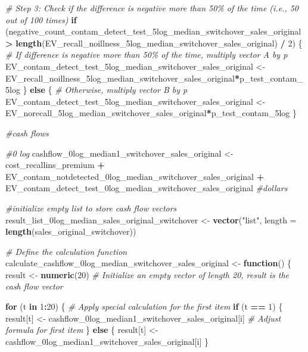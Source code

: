 \documentclass[
]{article}
\newenvironment{Shaded}{\begin{snugshade}}{\end{snugshade}}
\newcommand{\AttributeTok}[1]{\textcolor[rgb]{0.13,0.29,0.53}{#1}}
\newcommand{\CommentTok}[1]{\textcolor[rgb]{0.56,0.35,0.01}{\textit{#1}}}
\newcommand{\ControlFlowTok}[1]{\textcolor[rgb]{0.13,0.29,0.53}{\textbf{#1}}}
\newcommand{\DecValTok}[1]{\textcolor[rgb]{0.00,0.00,0.81}{#1}}
\newcommand{\FunctionTok}[1]{\textcolor[rgb]{0.13,0.29,0.53}{\textbf{#1}}}
\newcommand{\NormalTok}[1]{#1}
\newcommand{\OtherTok}[1]{\textcolor[rgb]{0.56,0.35,0.01}{#1}}
\newcommand{\SpecialCharTok}[1]{\textcolor[rgb]{0.81,0.36,0.00}{\textbf{#1}}}
\newcommand{\StringTok}[1]{\textcolor[rgb]{0.31,0.60,0.02}{#1}}
\begin{document}
\begin{Shaded}
\begin{Highlighting}[]
\CommentTok{\# Step 3: Check if the difference is negative more than 50\% of the time (i.e., 50 out of 100 times)}
\ControlFlowTok{if}\NormalTok{ (negative\_count\_contam\_detect\_test\_5log\_median\_switchover\_sales\_original }\SpecialCharTok{\textgreater{}} \FunctionTok{length}\NormalTok{(EV\_recall\_noillness\_5log\_median\_switchover\_sales\_original) }\SpecialCharTok{/} \DecValTok{2}\NormalTok{) \{}
  \CommentTok{\# If difference is negative more than 50\% of the time, multiply vector A by p}
\NormalTok{  EV\_contam\_detect\_test\_5log\_median\_switchover\_sales\_original }\OtherTok{\textless{}{-}}\NormalTok{ EV\_recall\_noillness\_5log\_median\_switchover\_sales\_original}\SpecialCharTok{*}\NormalTok{p\_test\_contam\_5log}
\NormalTok{\} }\ControlFlowTok{else}\NormalTok{ \{}
  \CommentTok{\# Otherwise, multiply vector B by p}
\NormalTok{ EV\_contam\_detect\_test\_5log\_median\_switchover\_sales\_original  }\OtherTok{\textless{}{-}}\NormalTok{ EV\_norecall\_5log\_median\_switchover\_sales\_original}\SpecialCharTok{*}\NormalTok{p\_test\_contam\_5log}
\NormalTok{\}}


\CommentTok{\#cash flows}

\CommentTok{\#0 log}
\NormalTok{cashflow\_0log\_median1\_switchover\_sales\_original }\OtherTok{\textless{}{-}}\NormalTok{ cost\_recallins\_premium }\SpecialCharTok{+}\NormalTok{ EV\_contam\_notdetected\_0log\_median\_switchover\_sales\_original }\SpecialCharTok{+}\NormalTok{ EV\_contam\_detect\_test\_0log\_median\_switchover\_sales\_original }\CommentTok{\#dollars}


\CommentTok{\#initialize empty list to store cash flow vectors}
\NormalTok{result\_list\_0log\_median\_sales\_original\_switchover }\OtherTok{\textless{}{-}} \FunctionTok{vector}\NormalTok{(}\StringTok{"list"}\NormalTok{, }\AttributeTok{length =} \FunctionTok{length}\NormalTok{(sales\_original\_switchover))}


\CommentTok{\# Define the calculation function}
\NormalTok{calculate\_cashflow\_0log\_median\_switchover\_sales\_original }\OtherTok{\textless{}{-}} \ControlFlowTok{function}\NormalTok{() \{}
\NormalTok{  result }\OtherTok{\textless{}{-}} \FunctionTok{numeric}\NormalTok{(}\DecValTok{20}\NormalTok{)  }\CommentTok{\# Initialize an empty vector of length 20, result is the cash flow vector}
  
  \ControlFlowTok{for}\NormalTok{ (t }\ControlFlowTok{in} \DecValTok{1}\SpecialCharTok{:}\DecValTok{20}\NormalTok{) \{}
    \CommentTok{\# Apply special calculation for the first item}
    \ControlFlowTok{if}\NormalTok{ (t }\SpecialCharTok{==} \DecValTok{1}\NormalTok{) \{}
\NormalTok{      result[t] }\OtherTok{\textless{}{-}}\NormalTok{ cashflow\_0log\_median1\_switchover\_sales\_original[i] }\CommentTok{\# Adjust formula for first item}
\NormalTok{    \} }\ControlFlowTok{else}\NormalTok{ \{}
\NormalTok{      result[t] }\OtherTok{\textless{}{-}}\NormalTok{ cashflow\_0log\_median1\_switchover\_sales\_original[i]}
\NormalTok{    \}}
    

\end{Highlighting}
\end{Shaded}
\end{document}
